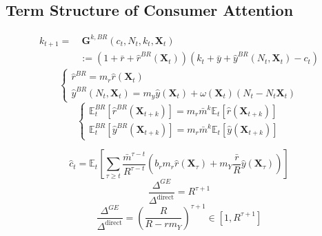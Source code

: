 \documentclass{beamer}
\begin{document}
\subsection{Term Structure of Consumer Attention}
\begin{frame}{\subsecname}
    \begin{equation} \tag{49}
        \begin{split}
            k_{t+1}= &\  \textbf{G}^{k,BR}(c_{t},N_{t},k_{t},\textbf{X}_{t}) \\
            & := (1+\bar{r}+\hat{r}^{BR}(\textbf{X}_t))(k_{t}+\bar{y}+\hat{y}^{BR}(N_{t},\textbf{X}_t)-c_{t})
        \end{split}
    \end{equation}
    \begin{equation}\tag{50}
        \begin{cases}
            \hat{r}^{BR} = m_{r} \hat{r}(\textbf{X}_{t}) \\
            \hat{y}^{BR}(N_{t},\textbf{X}_{t}) = m_{y}\hat{y}(\textbf{X}_{t})+\omega(\textbf{X}_{t})(N_{t}-N_{t}\textbf{X}_{t})
        \end{cases}
    \end{equation}
    \begin{equation}\tag{51}
        \begin{cases}
            \mathbb{E}_{t}^{BR}\left[\hat{r}^{BR}(\textbf{X}_{t+k})\right]=m_{r}\bar{m}^{k}\mathbb{E}_{t}\left[\hat{r}(\textbf{X}_{t+k})\right] \\
            \mathbb{E}_{t}^{BR}\left[\hat{y}^{BR}(\textbf{X}_{t+k})\right]=m_{r}\bar{m}^{k}\mathbb{E}_{t}\left[\hat{y}(\textbf{X}_{t+k})\right]
        \end{cases}
    \end{equation}
\end{frame}

\begin{frame}{\subsecname}
    \begin{equation}\tag{52}
        \hat{c}_{t}=\mathbb{E}_{t}\left[\sum_{\tau\geq t}\frac{\bar{m}^{\tau-t}}{R^{\tau-t}}\left(b_{r}m_{r}\hat{r}(\textbf{X}_{\tau})+m_{Y}\frac{\bar{r}}{R}\hat{y}(\textbf{X}_{\tau})\right)\right]
    \end{equation}
    \begin{equation}\tag{53}
        \frac{\Delta^{GE}}{\Delta^{\text{direct}}}=R^{\tau+1}
    \end{equation}
    \begin{equation}\tag{54}
        \frac{\Delta^{GE}}{\Delta^{\text{direct}}}=\left(\frac{R}{R-rm_{Y}}\right)^{\tau+1}\in\left[1, R^{\tau+1}\right]
    \end{equation}
\end{frame}
\end{document}
